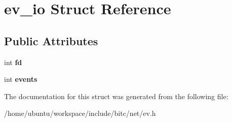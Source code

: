 \hypertarget{structev__io}{\section{ev\-\_\-io Struct Reference}
\label{structev__io}
}
\subsection*{Public Attributes}
\begin{DoxyCompactItemize}
\item 
\hypertarget{structev__io_a5c7e481bb08731a54a00c341d3fccb69}{int {\bfseries fd}}\label{structev__io_a5c7e481bb08731a54a00c341d3fccb69}

\item 
\hypertarget{structev__io_a439e3de48a504c0a64cc710338ce1349}{int {\bfseries events}}\label{structev__io_a439e3de48a504c0a64cc710338ce1349}

\end{DoxyCompactItemize}


The documentation for this struct was generated from the following file\-:\begin{DoxyCompactItemize}
\item 
/home/ubuntu/workspace/include/bitc/net/ev.\-h\end{DoxyCompactItemize}
